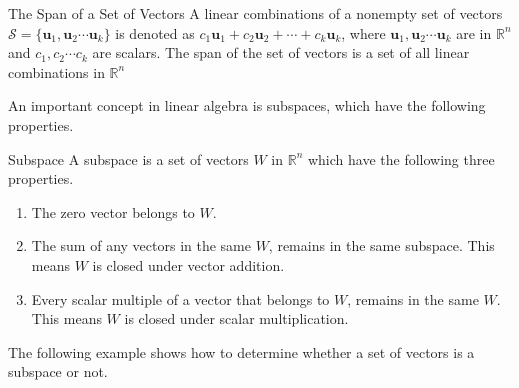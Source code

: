 \begin{definition} {The Span of a Set of Vectors}
A linear combinations of a nonempty set of vectors $\mathcal{S} = \{ \textbf{u}_1,\textbf{u}_2 \cdots \textbf{u}_k\}$ is denoted as $c_1 \textbf{u}_1 + c_2\textbf{u}_2+ \cdots+ c_k\textbf{u}_k$, where $\textbf{u}_1,\textbf{u}_2 \cdots \textbf{u}_k$ are in $\mathbb{R}^n$ and $c_1, c_2 \cdots c_k$ are scalars.
The span of the set of vectors is a set of all linear combinations in $\mathbb{R}^n$
\cite[66]{LiAl}
\end{definition}
An important concept in linear algebra is subspaces, which have the following properties.
\begin{definition}{Subspace}
A subspace is a set of vectors $W$ in $\mathbb{R}^n$ which have the following three properties. 
\begin{enumerate}
    \item The zero vector belongs to $W$.
    \item The sum of any vectors in the same $W$, remains in the same subspace. This means $W$ is closed under vector addition.
    \item Every scalar multiple of a vector that belongs to $W$, remains in the same $W$. This means $W$ is closed under scalar multiplication.
\end{enumerate}
\cite[227]{LiAl}
\label{exa:SubspaceDef}
\end{definition}
\noindent The following example shows how to determine whether a set of vectors is a subspace or not.
